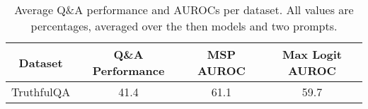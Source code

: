 \begin{table*}
\centering
\begin{tabular}{c|c|c|c}
Dataset & Q\&A Performance & MSP AUROC & Max Logit AUROC\\ \hline
TruthfulQA & 41.4 & 61.1 & 59.7\\
\hline
\end{tabular}
\caption{Average Q\&A performance and AUROCs per dataset. All values are percentages, averaged over the then models and two prompts.}
\label{tab:dataset}
\end{table*}
